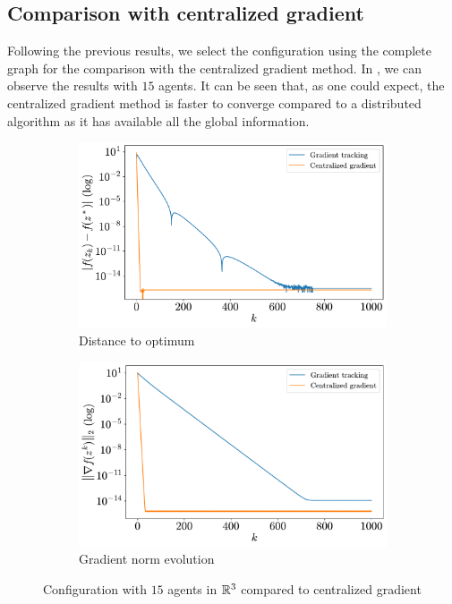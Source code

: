 \documentclass[a4paper,11pt,oneside]{book}
\begin{document}
\subsection{Comparison with centralized gradient}

Following the previous results, we select the configuration using the complete graph for the comparison with the centralized gradient method. In , we can observe the results with $15$ agents. It can be seen that, as one could expect, the centralized gradient method is faster to converge compared to a distributed algorithm as it has available all the global information.

\begin{figure}[H]
      \centering
      \begin{subfigure}[t]{0.49\textwidth}
            \centering
            \includegraphics[width=\linewidth]{./figs/quadratic/distance_centralized_15_3_1000.pdf} 
            \caption{Distance to optimum}
      \end{subfigure}
      \hfill
      \begin{subfigure}[t]{0.49\textwidth}
            \centering
            \includegraphics[width=\linewidth]{./figs/quadratic/gradient_centralized_15_3_1000.pdf} 
            \caption{Gradient norm evolution}
      \end{subfigure}
      \caption{Configuration with $15$ agents in ${\mathbb{R}}^{3}$ compared to centralized gradient}
      \label{fig:quadratic_centralized_15_3}
\end{figure}
\end{document}
